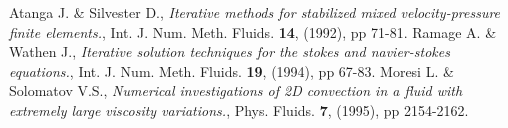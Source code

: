 \documentclass[a4paper]{article}
\begin{document}


\begin{thebibliography}{5000}
 Atanga J. \& Silvester D., {\it Iterative methods for stabilized mixed velocity-pressure finite elements.},
	Int. J. Num. Meth. Fluids. {\bf 14}, (1992), pp 71-81.
 Ramage A. \& Wathen J., {\it Iterative solution techniques for the stokes and navier-stokes equations.}, 
	Int. J. Num. Meth. Fluids. {\bf 19}, (1994), pp 67-83.		
 Moresi L. \& Solomatov V.S., {\it Numerical investigations of 2D convection in a fluid with extremely large viscosity variations.},
	Phys. Fluids. {\bf 7}, (1995), pp 2154-2162.
\end{thebibliography}
\end{document}

